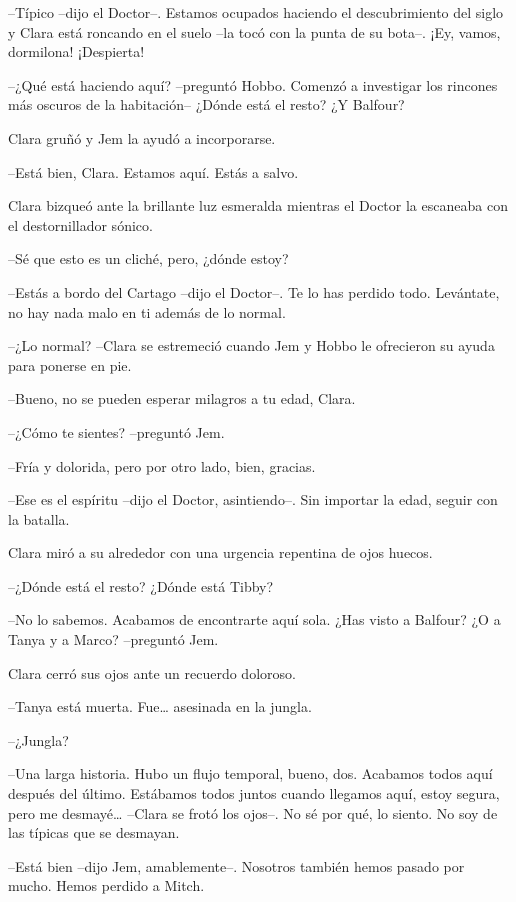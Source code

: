 {--Típico --dijo el Doctor--. Estamos ocupados haciendo el descubrimiento
 del siglo y Clara está roncando en el suelo --la tocó con la punta de su
bota--. ¡Ey, vamos, dormilona! ¡Despierta!}

{--¿Qué está haciendo aquí? --preguntó Hobbo. Comenzó a investigar los
 rincones más oscuros de la habitación-- ¿Dónde está el resto? ¿Y
Balfour?}

{Clara gruñó y Jem la ayudó a incorporarse.}

{--Está bien, Clara. Estamos aquí. Estás a salvo.}

{Clara bizqueó ante la brillante luz esmeralda mientras el Doctor la
escaneaba con el destornillador sónico.}

{--Sé que esto es un cliché, pero, ¿dónde estoy?}

{--Estás a bordo del Cartago --dijo el Doctor--. Te lo has perdido todo.
Levántate, no hay nada malo en ti además de lo normal.}

{--¿Lo normal? --Clara se estremeció cuando Jem y Hobbo le ofrecieron su
ayuda para ponerse en pie.}

{--Bueno, no se pueden esperar milagros a tu edad, Clara.}

{--¿Cómo te sientes? --preguntó Jem.}

{--Fría y dolorida, pero por otro lado, bien, gracias.}

{--Ese es el espíritu --dijo el Doctor, asintiendo--. Sin importar la
edad, seguir con la batalla.}

{Clara miró a su alrededor con una urgencia repentina de ojos huecos.}

{--¿Dónde está el resto? ¿Dónde está Tibby?}

{--No lo sabemos. Acabamos de encontrarte aquí sola. ¿Has visto a
Balfour? ¿O a Tanya y a Marco? --preguntó Jem.}

{Clara cerró sus ojos ante un recuerdo doloroso.}

{--Tanya está muerta. Fue\ldots{} asesinada en la jungla.}

{--¿Jungla?}

{--Una larga historia. Hubo un flujo temporal, bueno, dos. Acabamos todos
 aquí después del último. Estábamos todos juntos cuando llegamos aquí,
 estoy segura, pero me desmayé\ldots{} --Clara se frotó los ojos--. No sé
por qué, lo siento. No soy de las típicas que se desmayan.}

{--Está bien --dijo Jem, amablemente--. Nosotros también hemos pasado por
mucho. Hemos perdido a Mitch.}

